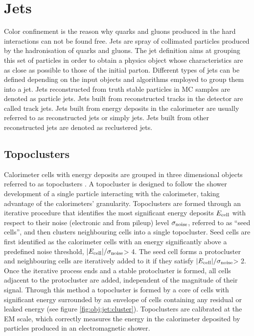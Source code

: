 \section{Jets}
\label{sec:obj:jets}
Color confinement is the reason why quarks and gluons produced in the hard interactions can not be found free. Jets are spray of collimated particles produced by the hadronisation of quarks and gluons. The jet definition aims at grouping this set of particles in order to obtain a physics object whose characteristics are as close as possible to those of the initial parton. Different types of jets can be defined depending on the input objects and algorithms employed to group them into a jet. Jets reconstructed from truth stable particles in MC samples are denoted as particle jets. Jets built from reconstructed tracks in the detector are called track jets. Jets built from energy deposits in the calorimeter are usually referred to as reconstructed jets or simply jets. Jets built from other reconstructed jets are denoted as reclustered jets.

\subsection{Topoclusters}
\label{sec:obj:jets:topoclusters}
Calorimeter cells with energy deposits are grouped in three dimensional objects referred to as topoclusters \cite{Lampl:2008zz}. A topocluster is designed to follow the shower development of a single particle interacting with the calorimeter, taking advantage of the calorimeters' granularity. Topoclusters are formed through an iterative procedure that identifies the most significant energy deposits $E_{\rm cell}$ with respect to their noise (electronic and from pileup) level $\sigma_{\rm noise}$, referred to as ``seed cells'', and then clusters neighbouring cells into a single topocluster.
Seed cells are first identified as the calorimeter cells with an energy significantly above a predefined noise threshold, $|E_{\rm cell}|/\sigma_{\rm noise}$> 4. The seed cell forms a protocluster and neighbouring cells are iteratively added to it if they satisfy $|E_{\rm cell}|/\sigma_{\rm noise}$> 2. Once the iterative process ends and a stable protocluster is formed, all cells adjacent to the protocluster are added, independent of the magnitude of their signal. Through this method a topocluster is formed by a core of cells with significant energy surrounded by an envelope of cells containing any residual or leaked energy (see figure \ref{fig:obj:jet:cluster}). Topoclusters are calibrated at the EM scale, which correctly measures the energy in the calorimeter deposited by particles produced in an electromagnetic shower.

